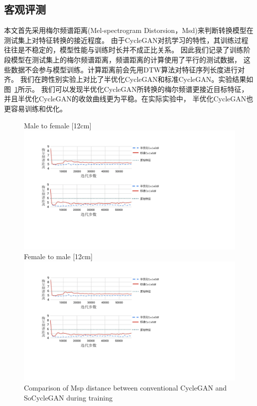 \subsection{客观评测}
本文首先采用梅尔频谱距离(Mel-spectrogram Distorsion，Msd)来判断转换模型在测试集上对特征转换的接近程度。
由于CycleGAN对抗学习的特性，其训练过程往往是不稳定的，模型性能与训练时长并不成正比关系。
因此我们记录了训练阶段模型在测试集上的梅尔频谱距离，频谱距离的计算使用了平行的测试数据，
这些数据不会参与模型训练。计算距离前会先用DTW算法对特征序列长度进行对齐。
我们在跨性别实验上对比了半优化CycleGAN和标准CycleGAN。实验结果如图~\ref{fig:msd}所示。
我们可以发现半优化CycleGAN所转换的梅尔频谱更接近目标特征，并且半优化CycleGAN的收敛曲线更为平稳。在实际实验中，
半优化CycleGAN也更容易训练和优化。

\begin{figure}[!hbtp]
    \centering
                    {Male to female}%
                    [12cm]{\includegraphics[width=12cm,trim=50 320 350 60,clip]{figure/4_msd.png}} \\
    \vspace{0.5cm}
                    {Female to male}%
                    [12cm]{\includegraphics[width=12cm,trim=50 150 350 240,clip]{figure/4_msd.png}}
              {Comparison of Msp distance between conventional CycleGAN and SoCycleGAN during training}
    \label{fig:msd}
  \end{figure}

